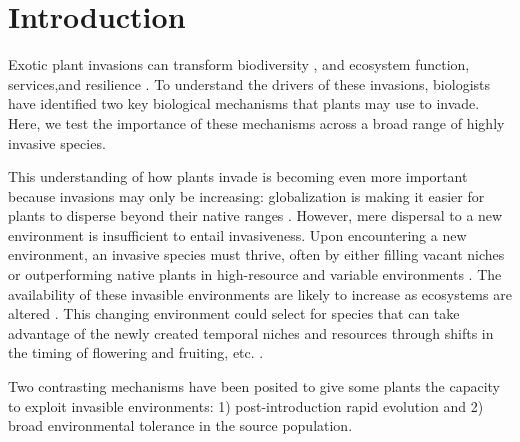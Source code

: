 \documentclass[12pt]{article}\usepackage[]{graphicx}\usepackage[]{color}
\begin{document}
	\section{Introduction}
	Exotic plant invasions  can transform biodiversity \parencite{Bellard2016,Clavero2005,Walker1997}, and ecosystem function, services,and resilience \parencite{Daehler1999,Daehler1994,Ehrenfeld2003,Wilcove1998,Pejchar2009,Pimentel2005,Pysek2010,OTA1993,Mack2000,Levine2003}.  
	To understand the drivers of these invasions, biologists have identified two key biological mechanisms that plants may use to invade.  Here, we test the importance of these mechanisms across a broad range of highly invasive species.
	
	This understanding of how plants invade is becoming even more important because invasions may only be increasing: globalization is making it easier for plants to disperse beyond their native ranges \parencite{Helmus2014,McKinney1999,Pysek2002,Vitousek1996,Wittenberg2001}. 
	However, mere dispersal to a new environment is insufficient to entail invasiveness. Upon encountering a new environment, an invasive species must thrive, often by either filling vacant niches \parencite{Elton1958} or outperforming native plants in high-resource and variable environments \parencite{Davis2001,Daehler2003}. The availability of these invasible environments are likely to increase as ecosystems are altered \parencite{Tilman2001, Blois2013,Inouye2008,Harte2015}. This changing environment could select for species that can take advantage of the newly created temporal niches and resources through shifts in the timing of flowering and fruiting, etc. \parencite{Franks2007}. 
	
	Two contrasting mechanisms have been posited to give some plants the capacity to exploit invasible environments: 1) post-introduction rapid evolution and 2) broad environmental tolerance in the source population. %
\end{document}
